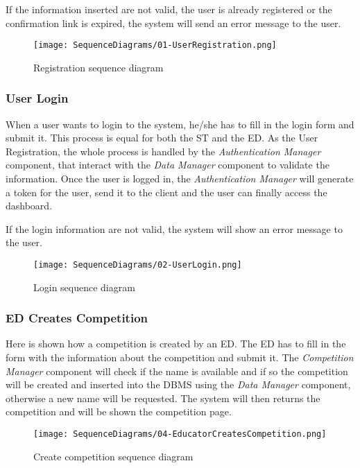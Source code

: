 If the information inserted are not valid, the user is already registered or the confirmation link is expired, the system will send an error message to the user.

\begin{figure}[H]
  \centering
  \texttt{[image: SequenceDiagrams/01-UserRegistration.png]}
  \caption{Registration sequence diagram}
  \label{fig:registratio_diagramn}
\end{figure}

\subsubsection*{User Login}
\label{ss:login_diagram}%
When a user wants to login to the system, he/she has to fill in the login form and submit it. This process is equal for both the ST and the ED. As the User Registration, the whole process is handled by the \textit{Authentication Manager} component, that interact with the \textit{Data Manager} component to validate the information. Once the user is logged in, the \textit{Authentication Manager} will generate a token for the user, send it to the client and the user can finally access the dashboard.

If the login information are not valid, the system will show an error message to the user.

\begin{figure}[H]
  \centering
  \texttt{[image: SequenceDiagrams/02-UserLogin.png]}
  \caption{Login sequence diagram}
  \label{fig:login_diagramn}
\end{figure}

\subsubsection*{ED Creates Competition}
\label{ss:create_competition_diagram}
Here is shown how a competition is created by an ED. The ED has to fill in the form with the information about the competition and submit it. The \textit{Competition Manager} component will check if the name is available and if so the competition will be created and inserted into the DBMS using the \textit{Data Manager} component, otherwise a new name will be requested. The system will then returns the competition and will be shown the competition page.

\begin{figure}[H]
  \centering
  \texttt{[image: SequenceDiagrams/04-EducatorCreatesCompetition.png]}
  \caption{Create competition sequence diagram}
  \label{fig:create_competition_diagramn}
\end{figure}

